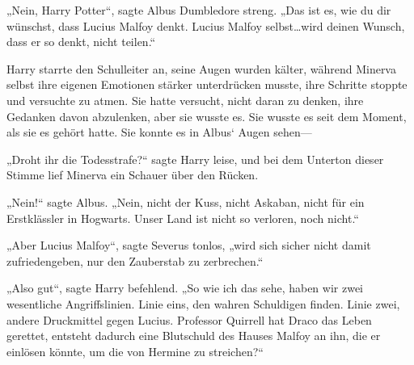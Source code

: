 „Nein, Harry Potter“, sagte Albus Dumbledore streng. „Das ist es, wie du dir wünschst, dass Lucius Malfoy denkt. Lucius Malfoy selbst…wird deinen Wunsch, dass er so denkt, nicht teilen.“

Harry starrte den Schulleiter an, seine Augen wurden kälter, während Minerva selbst ihre eigenen Emotionen stärker unterdrücken musste, ihre Schritte stoppte und versuchte zu atmen. Sie hatte versucht, nicht daran zu denken, ihre Gedanken davon abzulenken, aber sie wusste es. Sie wusste es seit dem Moment, als sie es gehört hatte. Sie konnte es in Albus‘ Augen sehen—

„Droht ihr die Todesstrafe?“ sagte Harry leise, und bei dem Unterton dieser Stimme lief Minerva ein Schauer über den Rücken.

„Nein!“ sagte Albus. „Nein, nicht der Kuss, nicht Askaban, nicht für ein Erstklässler in Hogwarts. Unser Land ist nicht so verloren, noch nicht.“

„Aber Lucius Malfoy“, sagte Severus tonlos, „wird sich sicher nicht damit zufriedengeben, nur den Zauberstab zu zerbrechen.“

„Also gut“, sagte Harry befehlend. „So wie ich das sehe, haben wir zwei wesentliche Angriffslinien. Linie eins, den wahren Schuldigen finden. Linie zwei, andere Druckmittel gegen Lucius. Professor Quirrell hat Draco das Leben gerettet, entsteht dadurch eine Blutschuld des Hauses Malfoy an ihn, die er einlösen könnte, um die von Hermine zu streichen?“

